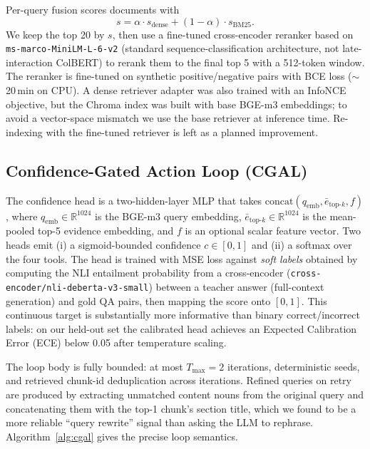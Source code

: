 \documentclass[11pt,a4paper,twocolumn]{article}
\begin{document}
Per-query fusion scores documents with
\[
s = \alpha \cdot s_{\text{dense}} + (1-\alpha)\cdot s_{\text{BM25}}.
\]
We keep the top 20 by $s$, then use a fine-tuned cross-encoder reranker
based on \texttt{ms-marco-MiniLM-L-6-v2} (standard sequence-classification
architecture, not late-interaction ColBERT) to rerank them to the final
top 5 with a 512-token window. The reranker is fine-tuned on synthetic
positive/negative pairs with BCE loss ($\sim$20\,min on CPU). A dense
retriever adapter was also trained with an InfoNCE objective, but the
Chroma index was built with base BGE-m3 embeddings; to avoid a
vector-space mismatch we use the base retriever at inference time.
Re-indexing with the fine-tuned retriever is left as a planned
improvement.

\subsection{Confidence-Gated Action Loop (CGAL)}\label{sec:cgal}

The confidence head is a two-hidden-layer MLP that takes
$\text{concat}(q_{\text{emb}}, \bar{e}_{\text{top-}k}, f)$, where
$q_{\text{emb}}\in\mathbb{R}^{1024}$ is the BGE-m3 query embedding,
$\bar{e}_{\text{top-}k}\in\mathbb{R}^{1024}$ is the mean-pooled
top-5 evidence embedding, and $f$ is an optional scalar feature
vector. Two heads emit (i) a sigmoid-bounded confidence $c\in[0,1]$ and
(ii) a softmax over the four tools. The head is trained with MSE loss
against \emph{soft labels} obtained by computing the NLI entailment
probability from a cross-encoder (\texttt{cross-encoder/nli-deberta-v3-small})
between a teacher answer (full-context generation) and gold QA pairs,
then mapping the score onto $[0,1]$. This continuous target is
substantially more informative than binary correct/incorrect labels: on
our held-out set the calibrated head achieves an Expected Calibration
Error (ECE) below 0.05 after temperature scaling.

The loop body is fully bounded: at most $T_{\max}{=}2$ iterations,
deterministic seeds, and retrieved chunk-id deduplication across
iterations. Refined queries on retry are produced by extracting unmatched
content nouns from the original query and concatenating them with the
top-1 chunk's section title, which we found to be a more reliable
``query rewrite'' signal than asking the LLM to rephrase.
Algorithm~\ref{alg:cgal} gives the precise loop semantics.
\end{document}
